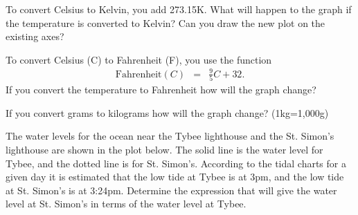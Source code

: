 \begin{problem}
\begin{subproblem}
    \item To convert Celsius to Kelvin, you add 273.15K. What will
      happen to the graph if the temperature is converted to Kelvin?
      Can you draw the new plot on the existing axes?
    
      \vfill
      
    \item To convert Celsius (C) to Fahrenheit (F), you use the
      function
      \begin{eqnarray*}
        \mathrm{Fahrenheit}(C) & = & \frac{9}{5}C + 32.
      \end{eqnarray*}
      If you convert the temperature to Fahrenheit how will the graph
      change?
    
      \vfill
    
    \item If you convert grams to kilograms how will the graph change?
      (1kg=1,000g)

  \end{subproblem}

\clearpage

\item The water levels for the ocean near the Tybee lighthouse and the
  St. Simon's lighthouse are shown in the plot below. The solid line
  is the water level for Tybee, and the dotted line is for
  St. Simon's. According to the tidal charts for a given day it is
  estimated that the low tide at Tybee is at 3pm, and the low tide at
  St. Simon's is at 3:24pm. Determine the expression that will give
  the water level at St. Simon's in terms of the water level at Tybee.

\hspace{-4em}
\end{problem}
